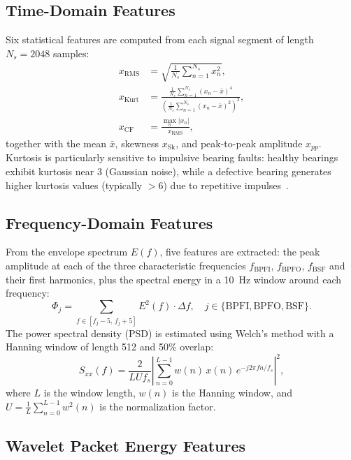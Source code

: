 \documentclass[conference,a4paper]{IEEEtran}[2015/08/26]
\begin{document}
\subsection{Time-Domain Features}

Six statistical features are computed from each signal segment of
length $N_s = 2048$ samples:
\begin{align}
  x_{\text{RMS}} &= \sqrt{\frac{1}{N_s}\sum_{n=1}^{N_s} x_n^2}, \label{eq:rms}\\[4pt]
  x_{\text{Kurt}} &= \frac{\tfrac{1}{N_s}\sum_{n=1}^{N_s}(x_n - \bar{x})^4}
                          {\left(\tfrac{1}{N_s}\sum_{n=1}^{N_s}(x_n - \bar{x})^2\right)^2}, \label{eq:kurt}\\[4pt]
  x_{\text{CF}} &= \frac{\max_n|x_n|}{x_{\text{RMS}}}, \label{eq:cf}
\end{align}
together with the mean $\bar{x}$, skewness $x_{\text{Sk}}$, and
peak-to-peak amplitude $x_{pp}$. Kurtosis is particularly sensitive to
impulsive bearing faults: healthy bearings exhibit kurtosis near 3
(Gaussian noise), while a defective bearing generates higher kurtosis
values (typically $> 6$) due to repetitive impulses~\cite{Antoni2007}.

\subsection{Frequency-Domain Features}

From the envelope spectrum $E(f)$, five features are extracted: the
peak amplitude at each of the three characteristic frequencies
$f_{\text{BPFI}}$, $f_{\text{BPFO}}$, $f_{\text{BSF}}$ and their
first harmonics, plus the spectral energy in a \SI{10}{\hertz} window
around each frequency:
\begin{equation}
  \Phi_j = \sum_{f \in [f_j - 5,\, f_j + 5]} E^2(f) \cdot \Delta f,
  \quad j \in \{\text{BPFI}, \text{BPFO}, \text{BSF}\}.
  \label{eq:psd_feat}
\end{equation}
The power spectral density (PSD) is estimated using Welch's method
with a Hanning window of length 512 and 50\% overlap:
\begin{equation}
  S_{xx}(f) = \frac{2}{L U f_s} \left| \sum_{n=0}^{L-1} w(n)\,x(n)\,
    e^{-j2\pi f n / f_s} \right|^{\!2},
  \label{eq:psd}
\end{equation}
where $L$ is the window length, $w(n)$ is the Hanning window, and
$U = \tfrac{1}{L}\sum_{n=0}^{L-1} w^2(n)$ is the normalization factor.

\subsection{Wavelet Packet Energy Features}
\end{document}
